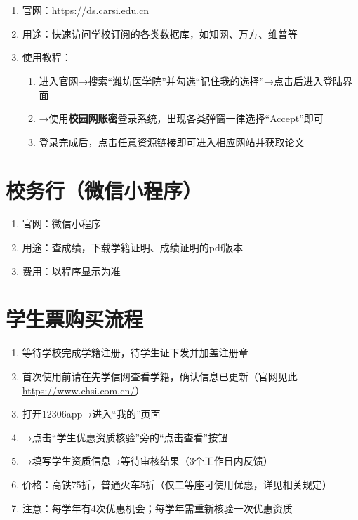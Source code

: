 \section[CARSI系统]{\textbf{}}
\label{carsi_system}
\begin{enumerate}
    \item 官网：\uline{\href{https://ds.carsi.edu.cn}{https://ds.carsi.edu.cn}}
    \item 用途：快速访问学校订阅的各类数据库，如知网、万方、维普等
    \item 使用教程：
          \begin{enumerate}
              \item 进入官网→搜索“潍坊医学院”并勾选“记住我的选择”→点击后进入登陆界面\footnotemark
              \item →使用\textbf{校园网账密}登录系统，出现各类弹窗一律选择“Accept”即可
              \item 登录完成后，点击任意资源链接即可进入相应网站并获取论文
          \end{enumerate}
\end{enumerate}

\section[校务行（微信小程序）]{校务行（微信小程序）}
\begin{enumerate}
    \item 官网：微信小程序
    \item 用途：查成绩，下载学籍证明、成绩证明的pdf版本
    \item 费用：以程序显示为准
\end{enumerate}

\section[学生票购买流程]{学生票购买\footnotemark 流程}
\begin{enumerate}
    \item 等待学校完成学籍注册，待学生证下发并加盖注册章
    \item 首次使用前请在先学信网查看学籍，确认信息已更新（官网见此\uline{\href{https://www.chsi.com.cn/}{https://www.chsi.com.cn/}}）
    \item 打开12306app→进入“我的”页面
    \item →点击“学生优惠资质核验”旁的“点击查看”按钮
    \item →填写学生资质信息→等待审核结果（3个工作日内反馈）
    \item 价格：高铁75折，普通火车5折（仅二等座可使用优惠，详见相关规定）
    \item 注意：每学年\footnotemark 有4次优惠机会；每学年需重新核验一次优惠资质
\end{enumerate}

